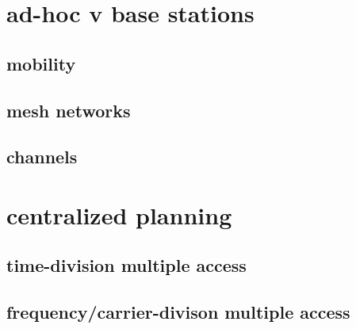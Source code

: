 \section{ad-hoc v base stations}


\subsection{mobility}


\subsection{mesh networks}


\subsection{channels}

\section{centralized planning}

\subsection{time-division multiple access}

\subsection{frequency/carrier-divison multiple access}

